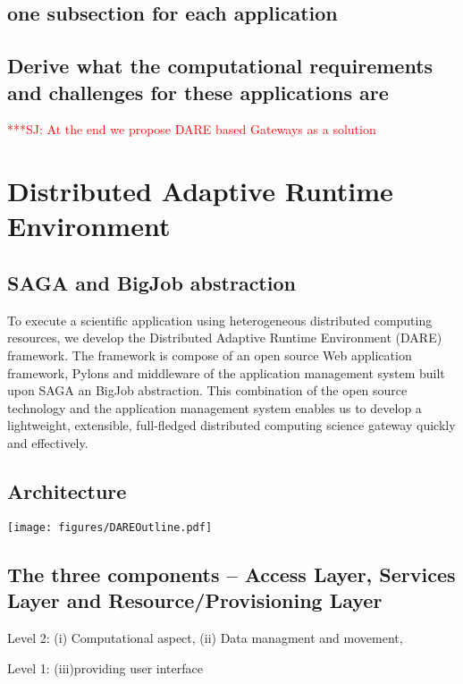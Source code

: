 \documentclass[12pt]{article}
\newcommand{\jhanote}[1]{ {\textcolor{red}     {***SJ: #1}}}
\newcommand{\jhanote}[1]{}
\begin{document}
\subsection{one subsection for each application}

\subsection{Derive what the computational requirements and challenges
  for these applications are}


\jhanote{At the end we propose DARE based Gateways as a solution}


\section{Distributed Adaptive Runtime Environment}

\subsection{SAGA and BigJob abstraction}

To execute a scientific application using heterogeneous distributed computing resources, we develop the Distributed Adaptive Runtime Environment (DARE) framework\cite{dareurl}.  The framework is compose of an open source Web application framework, Pylons
and middleware of the application management system built upon SAGA an BigJob abstraction\cite{saga-ccgrid10,saga-royalsoc,saga-web,jha2009developing,ecmls10}.  This combination of the open source technology and the application management system enables us to develop a lightweight, extensible, full-fledged distributed computing science gateway quickly and effectively\cite{pylonsurl}. 

\subsection{Architecture}
\texttt{[image: figures/DAREOutline.pdf]}

\subsection{The three components -- Access Layer, Services Layer and
  Resource/Provisioning Layer} 

Level 2: (i) Computational aspect, (ii) Data managment and movement, 

Level 1: (iii)providing user interface
\end{document}
